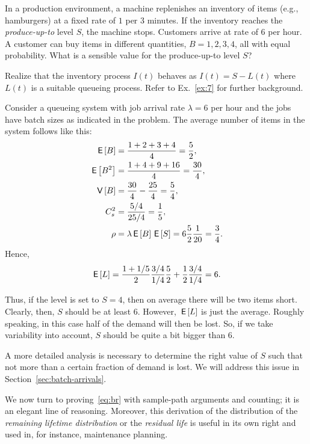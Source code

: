\begin{exercise}
  In a production environment, a machine replenishes an inventory of
  items (e.g., hamburgers) at a fixed rate of $1$ per 3 minutes. If
  the inventory reaches the \emph{produce-up-to} level $S$, the machine stops.  Customers
  arrive at rate of 6 per hour. A customer can buy items in different
  quantities, $B=1,2,3,4$, all with equal probability. What is a
  sensible value for the produce-up-to level $S$?   
  \begin{hint}
Realize that the inventory process $I(t)$ behaves as     $I(t)=S-L(t)$ where $L(t)$ is a suitable queueing process. Refer to Ex.~\ref{ex:7} for further background.
  \end{hint}
  \begin{solution}
Consider a queueing system with job
arrival rate $\lambda=6$ per hour and the jobs have batch sizes as
indicated in the problem. The average number of items in the system
follows like this:
    \begin{align*}
      \,\mathsf{E}\left[B\right] &= \frac{1+2+3+4}{4} = \frac 52, \\
      \,\mathsf{E}\left[B^2\right] &= \frac{1+4+9+16}{4} = \frac{30}4,\\
      \,\mathsf{V}\left[B\right] &= \frac{30}4 - \frac{25}4 = \frac 5 4,\\
      C_s^2 &= \frac{5/4}{25/4} = \frac 15,\\
      \rho &= \lambda \,\mathsf{E}\left[B\right] \,\mathsf{E}\left[S\right] = 6 \frac 52 \frac 1{20} = \frac 34.
    \end{align*}
Hence, 
\begin{equation*}
  \,\mathsf{E}\left[L\right] = \frac {1+1/5}2 \frac{3/4}{1/4} \frac 52 + \frac 12 \frac{3/4}{1/4} = 6.
\end{equation*}

Thus, if the level is set to $S=4$, then on average there will be two
items short. Clearly, then, $S$ should be at least $6$. However,
$\,\mathsf{E}\left[L\right]$ is just the average. Roughly speaking, in this case half of
the demand will then be lost. So, if we take variability into account,
$S$ should be quite a bit bigger than 6. 

A more detailed analysis is
necessary to determine the right value of $S$ such that not more than
a certain fraction of demand is lost. We will address this issue in
Section~\ref{sec:batch-arrivals}.
  \end{solution}
\end{exercise}



We now turn to proving~\eqref{eq:br} with sample-path arguments and
counting; it is an elegant line of reasoning. Moreover, this derivation of the distribution of  the \emph{remaining lifetime   distribution} or the \emph{residual life} is useful in its own right and used in, for instance, maintenance planning. 


